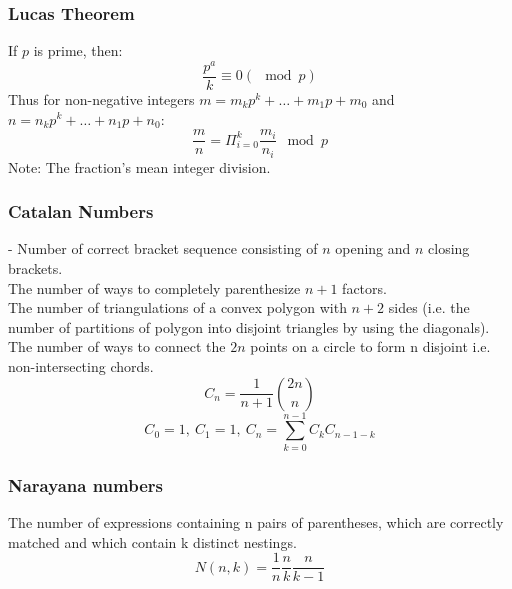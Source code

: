 \documentclass[
	a4paper,
	landscape,
	10pt,
]{article}
\begin{document}
\begin{multicols}{3}
		\subsubsection*{Lucas Theorem}
		If $p$ is prime, then:
		$$ \frac{p^a}{k} \equiv 0 (\mod p) $$
		Thus for non-negative integers $m = m_kp^k + \hdots + m_1 p + m_0$ and $n = n_k p^k + \hdots + n_1p + n_0$:
		$$ \frac{m}{n} =  \Pi_{i=0}^{k} \frac{m_i}{n_i} \mod p $$ Note: The fraction's mean integer division.
		

		\subsubsection*{Catalan Numbers} - Number of correct bracket sequence consisting of $n$ opening and $n$
		closing brackets. \\
		The number of ways to completely parenthesize $n+1$ factors. \\
		The number of triangulations of a convex polygon with $n+2$
		sides (i.e. the number of partitions of polygon into disjoint triangles by using the diagonals). \\
		The number of ways to connect the $2n$
		points on a circle to form n disjoint i.e. non-intersecting chords.
		$$ C_n = \frac{1}{n+1} \binom{2n}{n}$$
		$$ C_0 = 1,~C_1 = 1, ~C_n = \sum_{k=0}^{n-1}C_k C_{n-1-k}  $$

		\subsubsection*{Narayana numbers} The number of expressions containing n pairs of parentheses, which are correctly matched and which contain k distinct nestings. 
		$$ N(n,k) = \frac{1}{n} \frac{n}{k} \frac{n}{k-1} $$
\end{multicols}
\end{document}
